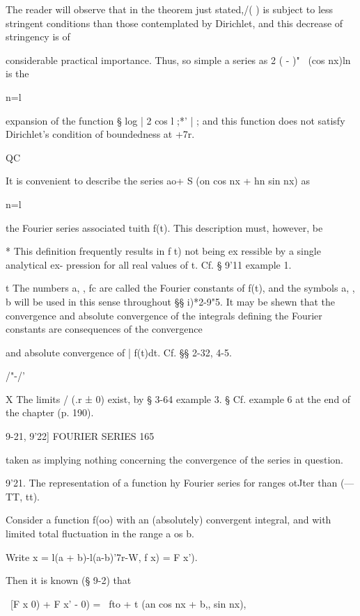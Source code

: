 The reader will observe that in the theorem just stated,/( ) is subject to less stringent 
conditions than those contemplated by Dirichlet, and this decrease of stringency is of 

considerable practical importance. Thus, so simple a series as 2 ( - )"~  (cos nx)ln is the 

n=l 

expansion of the function § log | 2 cos l ;*' | ; and this function does not satisfy Dirichlet's 
condition of boundedness at +7r. 

QC 

It is convenient to describe the series  ao+ S (on cos nx + hn sin nx) as 

n=l 

the Fourier series associated tuith f(t). This description must, however, be 

* This definition frequently results in f t) not being ex ressible by a single analytical ex- 
pression for all real values of t. Cf. § 9'11 example 1. 

t The numbers a, , fc  are called the Fourier constants of f(t), and the symbols a, , b  will be 
used in this sense throughout §§ i)*2-9"5. It may be shewn that the convergence and absolute 
convergence of the integrals defining the Fourier constants are consequences of the convergence 

and absolute convergence of | f(t)dt. Cf. §§ 2-32, 4-5. 



/"-/' 



X The limits / (.r ± 0) exist, by § 3-64 example 3. 
§ Cf. example 6 at the end of the chapter (p. 190). 



9-21, 9'22] FOURIER SERIES 165 

taken as implying nothing concerning the convergence of the series in 
question. 

9'21. The representation of a function hy Fourier series for ranges otJter 
than (— TT, tt). 

Consider a function f(oo) with an (absolutely) convergent integral, and 
with limited total fluctuation in the range a os b. 

Write x = l(a + b)-l(a-b)'7r-W, f x) = F x'). 

Then it is known (§ 9-2) that 

\ [F  x   0) + F x' - 0)  = \ fto + t (an cos nx + b,, sin nx), 

